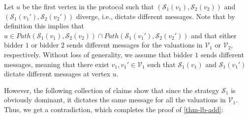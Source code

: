 Let $u$ be the first vertex in the protocol such that 
 $(\mathcal{S}_1(v_1),\mathcal{S}_2(v_2))$ and $(\mathcal{S}_1(v_1'),\mathcal{S}_2(v_2'))$ diverge, i.e., dictate different messages. 
Note that by definition this implies that $u\in Path(\mathcal{S}_1(v_1),\mathcal{S}_2(v_2))\cap Path(\mathcal{S}_1(v_1'),\mathcal{S}_2(v_2'))$ and that either bidder $1$ or bidder $2$ sends different messages for the valuations in $\mathcal{V}_1$ or $\mathcal V_2$, respectively. 
Without loss of generality, we assume that bidder $1$ sends different messages, meaning that there exist $v_1,v_1'\in \mathcal{V}_1$ such that $\mathcal S_1(v_1)$ and $\mathcal S_1(v_1')$ dictate different messages at vertex $u$.
\begin{comment}
Observe that either bidder $1$ or $2$ has to send different messages for different valuations in $\mathcal V_i$ at some vertex. 
This is an immediate implication of \cref{lemma-add-instances}. Due to \cref{lemma-add-instances}, 
the mechanism $A$ outputs different allocations for different valuation profiles in $\mathcal V_1\times \mathcal V_2$, so they necessarily end up in different leaves, so they necessarily diverge at some vertex.
 
 Let $u$ be the first vertex in the protocol of the mechanism $A$ where they diverge, meaning that  the behavior profiles $(\mathcal{S}_1(v_1),\mathcal{S}_2(v_2))$ and $(\mathcal{S}_1(v_1'),\mathcal{S}_2(v_2'))$ dictate different messages. 
Note that by definition $u\in Path(\mathcal{S}_1(v_1),\mathcal{S}_2(v_2))\cap Path(\mathcal{S}_1(v_1'),\mathcal{S}_2(v_2'))$. We remind that each vertex is associated with only one player that sends messages in it. Note that the distribution $\mathcal D$ we have defined is symmetric, so we can assume without loss of generality that player $1$ is the player that sends a message in vertex $u$. Thus, there exist $v_1,v_1'\in \mathcal{V}_1$ such that $\mathcal S_1(v_1)$ and $\mathcal S_1(v_1')$ dictate different messages at vertex $u$. 
\end{comment}
However, the following collection of claims show that since the strategy $\mathcal S_1$ is obviously dominant, it dictates the same message for all the valuations in $\mathcal{V}_1$. Thus, we get a contradiction, which completes the proof of \cref{thm-lb-add}:

